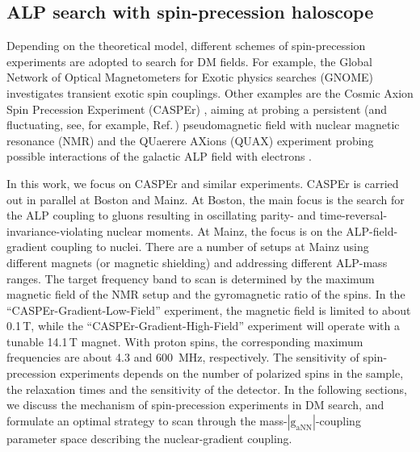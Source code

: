 \documentclass{WileyMSP-template}
\newcommand{\YZ}[1]{\textcolor{purple}{Yuzhe: #1}}
\newcommand{\HB}[1]{\textcolor{orange}{Hendrik: #1}}
\newcommand{\DK}[1]{\textcolor{brown}{Derek: #1}}
\newcommand{\AW}[1]{\textcolor{cyan}{Arne: #1}}
\begin{document}
	\subsection{ALP search with spin-precession haloscope}

	
	
	Depending on the theoretical model, different schemes of spin-precession experiments are adopted to search for DM fields.
	For example, the Global Network of Optical Magnetometers for Exotic physics searches (GNOME) \cite{Pustelny_AdP_GNOMEnovel, Pospelov_PhysRevLett_DomainWalls, Kimball_2018_PhysRevD_terrestrial, Masia-Roig_2020_Analysismethod, Afach_2021_topological} investigates transient exotic spin couplings. 
	Other examples are the Cosmic Axion Spin Precession Experiment (CASPEr) \cite{budkergraham2014proposal}, aiming at probing a persistent (and fluctuating, see, for example, Ref.\,\cite{Centers2021Stochastic}) pseudomagnetic field
	with nuclear magnetic resonance (NMR) and the QUaerere AXions (QUAX) experiment probing possible interactions of the galactic ALP field with 
	electrons %
	\cite{Crescini2020_Ferromagnetic}. 

	In this work, we focus on CASPEr and similar experiments. CASPEr is carried out in parallel at Boston and Mainz. At Boston, the main focus is the search for the ALP coupling to gluons resulting in oscillating parity- and time-reversal-invariance-violating nuclear moments. At Mainz, the focus is on the ALP-field-gradient coupling to nuclei. There are a number of setups at Mainz using different magnets (or magnetic shielding) and addressing different ALP-mass ranges. 
	The target frequency band to scan is determined by the maximum magnetic field of the NMR setup and the gyromagnetic ratio of the spins. 
	In the ``CASPEr-Gradient-Low-Field'' experiment, the magnetic field is limited to about 0.1\,T, while the ``CASPEr-Gradient-High-Field'' experiment will operate with a tunable 14.1\,T magnet.
	With proton spins,  the corresponding maximum frequencies are about 4.3 and \SI{600}{\MHz}, respectively. 
	The sensitivity of spin-precession experiments depends on the number of polarized spins in the sample, the relaxation times and the sensitivity of the detector. In the following sections, we discuss the mechanism of spin-precession experiments in DM search, and formulate an optimal strategy to scan through the mass-$|\mathrm{g_{aNN}}|$-coupling parameter space describing the nuclear-gradient coupling. 
\end{document}
